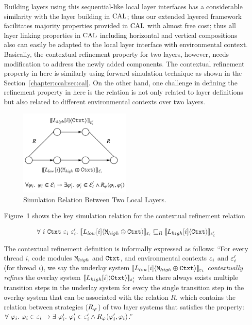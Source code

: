 Building layers using this sequential-like local layer interfaces has a considerable similarity with 
the layer building in $\mathrm{CAL}$; thus 
our extended layered framework facilitates
majority properties provided in $\mathrm{CAL}$ with almost free cost;
thus all layer linking properties in $\mathrm{CAL}$ including horizontal and vertical compositions also can 
easily be adapted to the local layer interface with environmental context.
Basically, the contextual refinement property for two layers, however, needs modification to address the newly added components. 
The contextual refinement property in here is similarly using forward simulation technique as shown in the 
Section~\ref{chapter:ccal:sec:cal}.
On the other hand, one challenge in defining the refinement property in here is the relation is not only related to layer definitions but also related to different environmental contexts over two layers. 
\begin{figure}
\begin{center}
\includegraphics[width=0.5\textwidth]{figs/ccal/locallayerrefinement}
\end{center}
\caption{Simulation Relation Between Two Local Layers.}
\label{fig:chapter:ccal:refinement-between-two-layers}
\end{figure}
Figure~\ref{fig:chapter:ccal:refinement-between-two-layers} shows the key simulation relation for 
the contextual refinement relation 
\begin{definition}
$$
\forall \ i\  \codeinmath{Ctxt} \ \oracle_i \ \oracle_i' .\ \sem{L_{low}[i]}{\codeinmath{M}_{high} \oplus \codeinmath{Ctxt}}_{\oracle_i} \refines_R \sem{L_{high}[i]}{\codeinmath{Ctxt}}_{\oracle_i'}
$$
\end{definition}
The contextual refinement definition is informally expressed as follows:
{\quote
``For every thread $i$,  code modules ${\mathrm{\texttt{M}}}_{high}$ and  ${\mathrm{\texttt{Ctxt}}}$,  and environmental contexts
  ${\varepsilon}_i$ and ${\varepsilon}_i'$ (for thread $i$), we say the underlay system   $[\![{L_{low}[i]} \langle {{\mathrm{\texttt{M}}}_{high} \oplus {\mathrm{\texttt{Ctxt}}}} \rangle]\!]_{{\varepsilon}_i}$
     \textit{contextually
 refines} the overlay system $ [\![{L_{high}[i]} \langle {{\mathrm{\texttt{Ctxt}}}} \rangle]\!]_{{\varepsilon}_i'}$ when there always exists 
 multiple  transition steps in the underlay system for every the single  transition step
  in the overlay system that can be associated with the relation $R$,
which contains the relation between strategies ($R_{\varphi_{}}$)
 of two layer systems that satisfies the property:
$\forall \ \strat{i} . \ \strat{i} \in \oracle_i \rightarrow \exists \ \stratp{i} . \ \stratp{i} \in \oracle_i' \wedge R_{\strat{}}(\stratp{i}, \strat{i})$.''}

